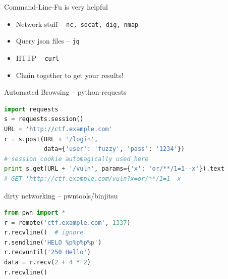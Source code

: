 \begin{frame}
  {Command-Line-Fu is very helpful}

  \begin{itemize}
    \item Network stuff -- \texttt{nc, socat, dig, nmap}
    \item Query json files -- \texttt{jq}
    \item HTTP -- \texttt{curl}
  \end{itemize}

  \begin{itemize}
    \item Chain together to get your results!
  \end{itemize}
\end{frame}


\begin{frame}[fragile]
  {Automated Browsing -- python-requests}

  \begin{lstlisting}[language=python]
import requests
s = requests.session()
URL = 'http://ctf.example.com'
r = s.post(URL + '/login',
           data={'user': 'fuzzy', 'pass': '1234'})
# session cookie automagically used here
print s.get(URL + '/vuln', params={'x': 'or/**/1=1--x'}).text
# GET 'http://ctf.example.com/vuln?x=or/**/1=1--x
  \end{lstlisting}
\end{frame}


\begin{frame}[fragile]
  {dirty networking -- pwntools/binjitsu}

  \begin{lstlisting}[language=python]
from pwn import *
r = remote('ctf.example.com', 1337)
r.recvline()  # ignore
r.sendline('HELO %p%p%p%p')
r.recvuntil('250 Hello')
data = r.recv(2 + 4 * 2)
r.recvline()
  \end{lstlisting}
\end{frame}





